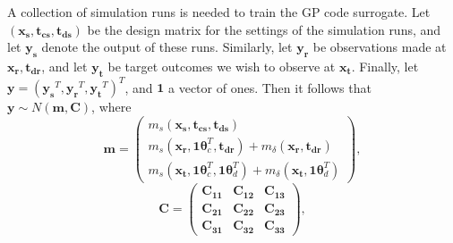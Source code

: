 \documentclass[10pt]{asme2ej}
\begin{document}
%
A collection of simulation runs is needed to train the GP code surrogate.
%
Let $(\mathbf{x_s},\mathbf{t_{cs}},\mathbf{t_{ds}})$ be the design matrix for the settings of the simulation runs, and let $\mathbf{y_s}$ denote the output of these runs.
%
Similarly, let $\mathbf{y_r}$ be observations made at $\mathbf{x_r},\mathbf{t_{dr}}$, and let $\mathbf {y_t}$ be target outcomes we wish to observe at $\mathbf {x_t}$.
%
Finally, let $\mathbf y = (\mathbf{y_s}^T,\mathbf{y_r}^T,\mathbf{y_t}^T)^T$, and $\mathbf 1$ a vector of ones.
%
Then it follows that $\mathbf y\sim {N}(\mathbf m,\mathbf C)$, where
\begin{equation}
	\mathbf m = \begin{pmatrix}
		m_s(\mathbf{x_s},\mathbf{t_{cs}},\mathbf{t_{ds}})\\
		m_s(\mathbf{x_r},\mathbf1\boldsymbol\theta_c^T,\mathbf{t_{dr}}) + m_\delta(\mathbf{x_r},\mathbf{t_{dr}})\\
		m_s(\mathbf{x_t},\mathbf1\boldsymbol\theta_c^T,\mathbf1\boldsymbol\theta_d^T) + m_\delta(\mathbf{x_t},\mathbf1\boldsymbol\theta_d^T)
	\end{pmatrix},
\end{equation}
\begin{equation}
	\mathbf C = \begin{pmatrix}
		\mathbf{C_{11}} & \mathbf{C_{12}} & \mathbf{C_{13}}\\
		\mathbf{C_{21}} & \mathbf{C_{22}} & \mathbf{C_{23}}\\
		\mathbf{C_{31}} & \mathbf{C_{32}} & \mathbf{C_{33}}
	\end{pmatrix},
\end{equation}
\end{document}
